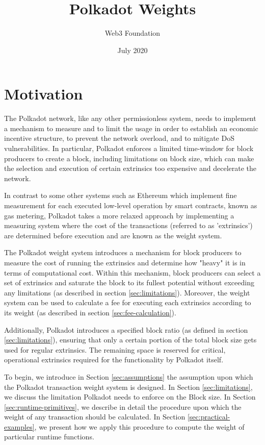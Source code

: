 \documentclass[11pt,a4paper]{article}
\begin{document}
\title{Polkadot Weights}
\author{Web3 Foundation}
\date{July 2020}
\maketitle

\section{Motivation}
The Polkadot network, like any other permissionless system, needs to implement a
mechanism to measure and to limit the usage in order to establish an economic
incentive structure, to prevent the network overload, and to mitigate DoS
vulnerabilities. In particular, Polkadot enforces a limited time-window for
block producers to create a block, including limitations on block size, which
can make the selection and execution of certain extrinsics too expensive and
decelerate the network.
\newline

In contrast to some other systems such as Ethereum which implement fine
measurement for each executed low-level operation by smart contracts, known as
gas metering, Polkadot takes a more relaxed approach by implementing a measuring
system where the cost of the transactions (referred to as 'extrinsics') are
determined before execution and are known as the weight system.

The Polkadot weight system introduces a mechanism for block producers to measure
the cost of running the extrinsics and determine how "heavy" it is in terms of
computational cost. Within this mechanism, block producers can select a set of
extrinsics and saturate the block to its fullest potential without exceeding any
limitations (as described in section \ref{sec:limitations}). Moreover, the
weight system can be used to calculate a fee for executing each extrinsics
according to its weight (as described in section \ref{sec:fee-calculation}).
\newline

Additionally, Polkadot introduces a specified block ratio (as defined in section
\ref{sec:limitations}), ensuring that only a certain portion of the total block
size gets used for regular extrinsics. The remaining space is reserved for
critical, operational extrinsics required for the functionality by Polkadot
itself.

To begin, we introduce in Section \ref{sec:assumptions} the assumption upon
which the Polkadot transaction weight system is designed. In Section
\ref{sec:limitations}, we discuss the limitation Polkadot needs to enforce on
the Block size. In Section \ref{sec:runtime-primitives}, we describe in detail
the procedure upon which the weight of any transaction should be calculated. In
Section \ref{sec:practical-examples}, we present how we apply this procedure to
compute the weight of particular runtime functions.
\end{document}
